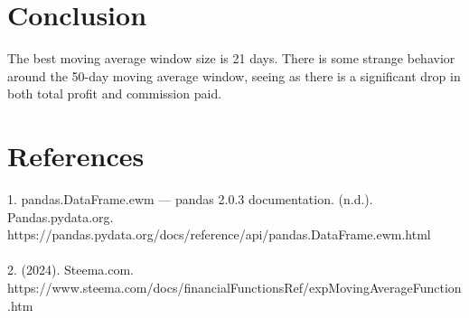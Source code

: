 \documentclass{article}
\begin{document}
\section*{Conclusion}
The best moving average window size is 21 days. There is some strange behavior around the 50-day moving average window, seeing as there is a significant drop in both total profit and commission paid.

\section*{References}
1. pandas.DataFrame.ewm — pandas 2.0.3 documentation. (n.d.). Pandas.pydata.org. https://pandas.pydata.org/docs/reference/api/pandas.DataFrame.ewm.html
\\\\
2.
(2024). Steema.com. \\ https://www.steema.com/docs/financialFunctionsRef/expMovingAverageFunction.htm
\end{document}
